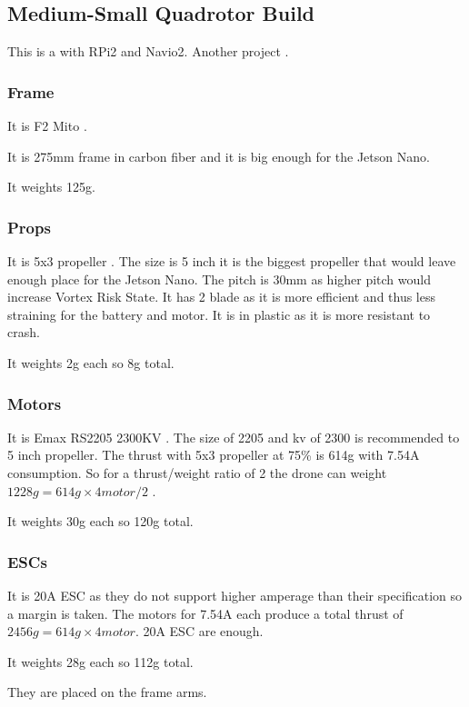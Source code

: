 \subsection{Medium-Small Quadrotor Build}


This is a \cite{hackaday_navio} with RPi2 and Navio2.
Another project \cite{instructables_navio}.

\subsubsection{Frame}
It is F2 Mito \cite{bangood_f2_mito}.

It is 275mm frame in carbon fiber and it is big enough for the Jetson Nano.

It weights 125g.

\subsubsection{Props}
It is 5x3 propeller \cite{bangood_propeller}. The size is 5 inch it is the biggest propeller that would leave enough place for the Jetson Nano. The pitch is 30mm as higher pitch would increase Vortex Risk State. It has 2 blade as it is more efficient and thus less straining for the battery and motor. It is in plastic as it is more resistant to crash.

It weights 2g each so 8g total.

\subsubsection{Motors}
It is Emax RS2205 2300KV \cite{bangood_motor}. The size of 2205 and kv of 2300 is recommended to 5 inch propeller. The thrust with 5x3 propeller at 75\% is 614g with 7.54A consumption. So for a thrust/weight ratio of 2 the drone can weight $1228g=614g \times 4motor / 2$ \cite{google_sheets_motor}.

It weights 30g each so 120g total.

\subsubsection{ESCs}
It is 20A ESC \cite{bangood_esc} as they do not support higher amperage than their specification so a margin is taken. The motors for 7.54A each produce a total thrust of $2456g=614g\times 4motor$. 20A ESC are enough.

It weights 28g each so 112g total.

They are placed on the frame arms.

